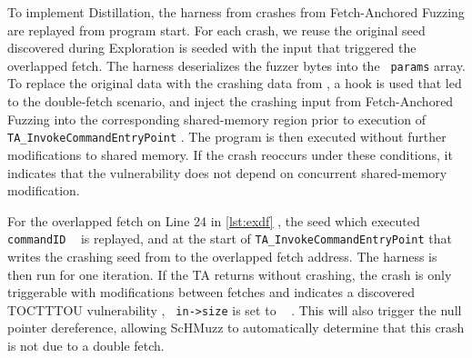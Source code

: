 \documentclass[conference]{IEEEtran} %
\newcommand{\sysname}{ScHMuzz\xspace}
\newcommand{\stageone}{Exploration\xspace}
\newcommand{\stagetwo}{Fetch-Anchored Fuzzing\xspace} %
\newcommand{\stagethree}{Distillation\xspace}
\providecommand{\DIFaddtex}[1]{{\protect\color{blue} \sf #1}} %
\providecommand{\DIFdeltex}[1]{{\protect\color{red} \scriptsize #1}} %
\providecommand{\DIFaddbegin}{} %
\providecommand{\DIFaddend}{} %
\providecommand{\DIFdelbegin}{} %
\providecommand{\DIFdelend}{} %
\providecommand{\DIFadd}[1]{\texorpdfstring{\DIFaddtex{#1}}{#1}} %
\providecommand{\DIFdel}[1]{\texorpdfstring{\DIFdeltex{#1}}{}} %
\begin{document}


\DIFadd{To implement }\DIFaddend \stagethree, the \DIFdelbegin \DIFdel{harness from }\DIFdelend \DIFaddbegin \DIFadd{crashes from }\stagetwo \DIFadd{are replayed from program start. For each crash, 
we reuse the original seed discovered 
during }\DIFaddend \stageone \DIFdelbegin \DIFdel{is seeded with the input that triggered the overlapped fetch. 
The harness deserializes 
the fuzzer bytes into the 
}\texttt{\DIFdel{params}} %
\DIFdel{array. 
To replace the original data with the crashing data from }%
\DIFdel{, a hook is used }\DIFdelend \DIFaddbegin \DIFadd{that led to the double-fetch scenario, and inject the crashing input from }\stagetwo 
\DIFadd{into the corresponding shared-memory region prior to execution of }\texttt{\DIFadd{TA\_InvokeCommandEntryPoint}}\DIFadd{. 
The program is then executed without further 
modifications to shared memory. If the crash reoccurs under these conditions, it indicates that the 
vulnerability does not depend on concurrent shared-memory modification. 
}


\DIFadd{For the overlapped fetch on Line 24 in }\autoref{lst:exdf}\DIFadd{, the seed which executed }\texttt{\DIFadd{commandID}} 
\texttt{\DIFadd{3}} \DIFadd{is replayed, and }\DIFaddend at the start of \texttt{TA\_InvokeCommandEntryPoint}\DIFdelbegin \DIFdel{that writes the crashing seed 
from }%
\DIFdel{to the overlapped fetch address. 
The harness is then run for one iteration. If the TA returns without crashing, the crash is only triggerable with modifications between fetches and indicates a discovered TOCTTTOU vulnerability}\DIFdelend \DIFaddbegin \DIFadd{, }\texttt{\DIFadd{in->size}} \DIFadd{is set to 
}\texttt{\DIFadd{1234}}\DIFadd{. This will also trigger the null pointer dereference, allowing }\sysname \DIFadd{to automatically 
determine that this crash is not due to a double fetch}\DIFaddend .
\end{document}
